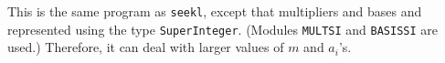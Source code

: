 
This is the same program as {\tt seekl}, except that multipliers and
bases and represented using the type {\tt SuperInteger}.
(Modules {\tt MULTSI} and {\tt BASISSI} are used.)
Therefore, it can deal with larger values of $m$ and $a_i$'s.

